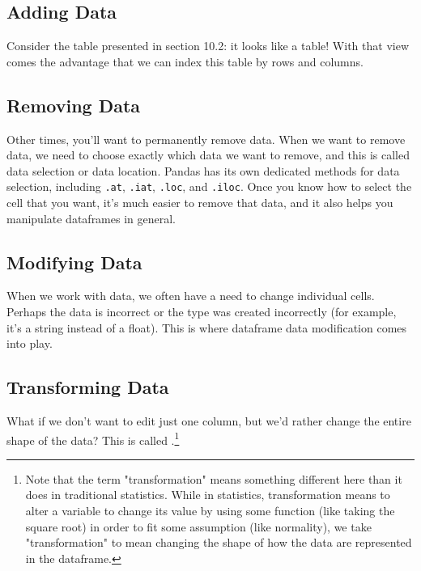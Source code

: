 \subsection{Adding Data}
Consider the table presented in section 10.2: it looks like a table! With that view comes the advantage that we can index this table by rows and columns.\par
{}
\subsection{Removing Data}
Other times, you'll want to permanently remove data. When we want to remove data, we need to choose exactly which data we want to remove, and this is called data selection or data location. Pandas has its own dedicated methods for data selection, including \verb|.at|, \verb|.iat|, \verb|.loc|, and \verb|.iloc|. Once you know how to select the cell that you want, it's much easier to remove that data, and it also helps you manipulate dataframes in general.
\subsection{Modifying Data}
When we work with data, we often have a need to change individual cells. Perhaps the data is incorrect or the type was created incorrectly (for example, it's a string instead of a float). This is where dataframe data modification comes into play.
\subsection{Transforming Data}
What if we don't want to edit just one column, but we'd rather change the entire shape of the data? This is called .\footnote{Note that the term "transformation" means something different here than it does in traditional statistics. While in statistics, transformation means to alter a variable to change its value by using some function (like taking the square root) in order to fit some assumption (like normality), we take "transformation" to mean changing the shape of how the data are represented in the dataframe.}

